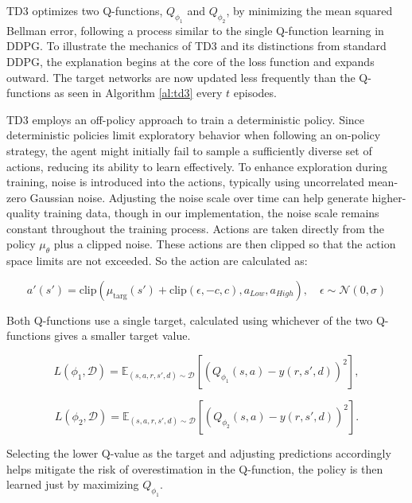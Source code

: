 TD3 optimizes two Q-functions, $Q_{\phi_1}$ and $Q_{\phi_2}$, by minimizing the mean squared Bellman error, following a process similar to the single Q-function learning in DDPG. To illustrate the mechanics of TD3 and its distinctions from standard DDPG, the explanation begins at the core of the loss function and expands outward. The target networks are now updated less frequently than the Q-functions as seen in Algorithm \ref{al:td3} every $t$ episodes. 

TD3 employs an off-policy approach to train a deterministic policy. Since deterministic policies limit exploratory behavior when following an on-policy strategy, the agent might initially fail to sample a sufficiently diverse set of actions, reducing its ability to learn effectively. To enhance exploration during training, noise is introduced into the actions, typically using uncorrelated mean-zero Gaussian noise. Adjusting the noise scale over time can help generate higher-quality training data, though in our implementation, the noise scale remains constant throughout the training process. Actions are taken directly from the policy $\mu_\theta$ plus a clipped noise. These actions are then clipped so that the action space limits are not exceeded. So the action are calculated as:

\begin{equation*}
    a'(s') = \text{clip} \left(\mu_{\text{targ}}(s') + \text{clip}(\epsilon, -c, c), a_{Low}, a_{High}\right), \quad \epsilon \sim \mathcal{N}(0, \sigma)
\end{equation*}

Both Q-functions use a single target, calculated using whichever of the two Q-functions gives a smaller target value.

\begin{equation*}
    L(\phi_1, \mathcal{D}) = \mathbb{E}_{(s,a,r,s',d)\sim\mathcal{D}}\left[\left(Q_{\phi_1}(s,a) - y(r,s',d)\right)^2\right],
\end{equation*}

\begin{equation*}
    L(\phi_2, \mathcal{D}) = \mathbb{E}_{(s,a,r,s',d)\sim\mathcal{D}}\left[\left(Q_{\phi_2}(s,a) - y(r,s',d)\right)^2\right].
\end{equation*}

Selecting the lower Q-value as the target and adjusting predictions accordingly helps mitigate the risk of overestimation in the Q-function, the policy is then learned just by maximizing $Q_{\phi_1}$.

